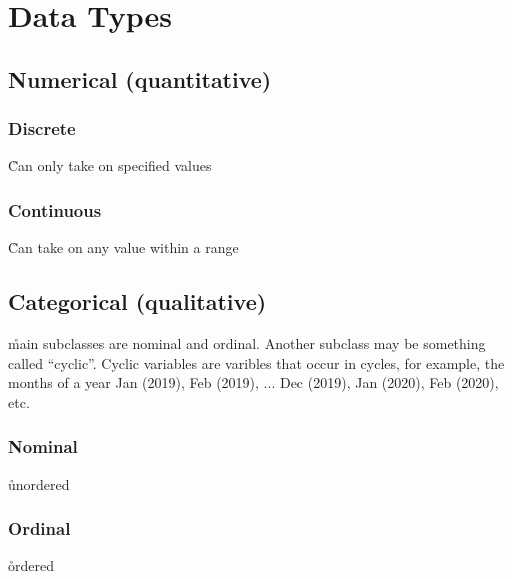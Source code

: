 \section{Data Types}



\subsection{Numerical (quantitative)}

\subsubsection{Discrete}

\r{Can only take on specified values}

\subsubsection{Continuous}

\r{Can take on any value within a range}

\subsection{Categorical (qualitative)}

\r{main subclasses are nominal and ordinal. Another subclass may be something called ``cyclic''. Cyclic variables are varibles that occur in cycles, for example, the months of a year Jan (2019), Feb (2019), ... Dec (2019), Jan (2020), Feb (2020), etc.}

\subsubsection{Nominal}

\r{unordered}


\subsubsection{Ordinal}

\r{ordered}

